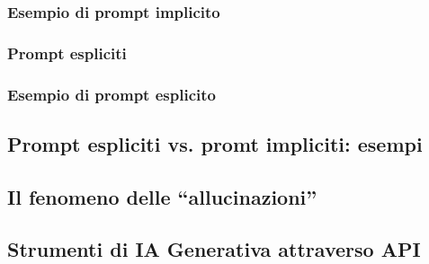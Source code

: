         \subsubsection{Esempio di prompt implicito}
        \subsubsection{Prompt espliciti}
        \subsubsection{Esempio di prompt esplicito}
    \subsection{Prompt espliciti vs. promt impliciti: esempi}
    \subsection{Il fenomeno delle ``allucinazioni''}
    \subsection{Strumenti di IA Generativa attraverso API}
